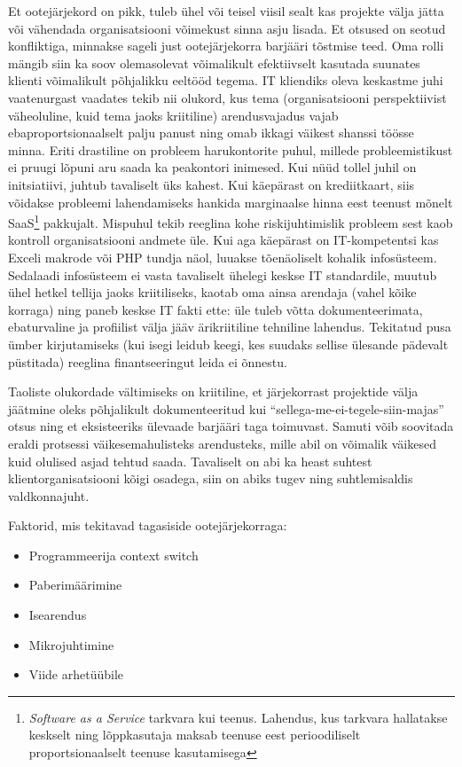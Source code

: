 Et ootejärjekord on pikk, tuleb ühel või teisel viisil sealt kas projekte välja jätta või vähendada organisatsiooni võimekust sinna asju lisada. Et otsused on seotud konfliktiga, minnakse sageli just ootejärjekorra barjääri tõstmise teed. Oma rolli mängib siin ka soov olemasolevat võimalikult efektiivselt kasutada suunates klienti võimalikult põhjalikku eeltööd tegema. IT kliendiks oleva keskastme juhi vaatenurgast vaadates tekib nii olukord, kus tema (organisatsiooni perspektiivist väheoluline, kuid tema jaoks kriitiline) arendusvajadus vajab ebaproportsionaalselt palju panust ning omab ikkagi väikest shanssi töösse minna. Eriti drastiline on probleem harukontorite puhul, millede probleemistikust ei pruugi lõpuni aru saada ka peakontori inimesed. Kui nüüd tollel juhil on initsiatiivi, juhtub tavaliselt üks kahest. Kui käepärast on krediitkaart, siis võidakse probleemi lahendamiseks hankida marginaalse hinna eest teenust mõnelt SaaS\footnote{\emph{Software as a Service} tarkvara kui teenus. Lahendus, kus tarkvara hallatakse keskselt ning lõppkasutaja maksab teenuse eest perioodiliselt proportsionaalselt teenuse kasutamisega} pakkujalt. Mispuhul tekib reeglina kohe riskijuhtimislik probleem sest kaob kontroll organisatsiooni andmete üle. Kui aga käepärast on IT-kompetentsi kas Exceli makrode või PHP tundja näol, luuakse tõenäoliselt kohalik infosüsteem. Sedalaadi infosüsteem ei vasta tavaliselt ühelegi keskse IT standardile, muutub ühel hetkel tellija jaoks kriitiliseks, kaotab oma ainsa arendaja (vahel kõike korraga) ning paneb keskse IT fakti ette: üle tuleb võtta dokumenteerimata, ebaturvaline ja profiilist välja jääv ärikriitiline tehniline lahendus. Tekitatud pusa ümber kirjutamiseks (kui isegi leidub keegi, kes suudaks sellise ülesande pädevalt püstitada) reeglina finantseeringut leida ei õnnestu. 

Taoliste olukordade vältimiseks on kriitiline, et järjekorrast projektide välja jäätmine oleks põhjalikult dokumenteeritud kui \enquote{sellega-me-ei-tegele-siin-majas} otsus ning et eksisteeriks ülevaade barjääri taga toimuvast. Samuti võib soovitada eraldi protsessi väikesemahulisteks arendusteks, mille abil on võimalik väikesed kuid olulised asjad tehtud saada. Tavaliselt on abi ka heast suhtest klientorganisatsiooni kõigi osadega, siin on abiks tugev ning suhtlemisaldis valdkonnajuht.

\TODO Faktorid, mis tekitavad tagasiside ootejärjekorraga:
\begin{itemize}
	\item Programmeerija context switch
	\item Paberimäärimine
	\item Isearendus
	\item Mikrojuhtimine
	\item Viide arhetüübile
\end{itemize}

